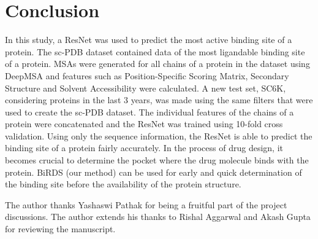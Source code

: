 \documentclass[journal=jacsat,manuscript=article]{achemso}
\begin{document}
\section{Conclusion}
In this study, a ResNet was used to predict the most active binding site of a protein. The sc-PDB\cite{desaphy2015sc} dataset contained data of the most ligandable binding site of a protein. MSAs were generated for all chains of a protein in the dataset using DeepMSA and features such as Position-Specific Scoring Matrix, Secondary Structure and Solvent Accessibility were calculated. A new test set, SC6K, considering proteins in the last 3 years, was made using the same filters that were used to create the sc-PDB dataset. The individual features of the chains of a protein were concatenated and the ResNet was trained using 10-fold cross validation. Using only the sequence information, the ResNet is able to predict the binding site of a protein fairly accurately. In the process of drug design, it becomes crucial to determine the pocket where the drug molecule binds with the protein. BiRDS (our method) can be used for early and quick determination of the binding site before the availability of the protein structure.

\begin{acknowledgement}
    The author thanks Yashaswi Pathak for being a fruitful part of the project discussions. The author extends his thanks to Rishal Aggarwal and Akash Gupta for reviewing the manuscript.

\end{acknowledgement}


\end{document}
